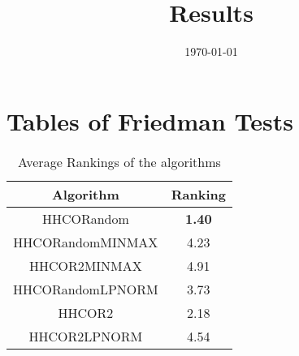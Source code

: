 \documentclass{article}
\title{Results}
\author{}
\date{\today}
\begin{document}
\oddsidemargin 0in \topmargin 0in\maketitle
\section{Tables of Friedman Tests}
\begin{table}[!htp]
\centering
\caption{Average Rankings of the algorithms
}\begin{tabular}{|c|c|}
\hline
Algorithm&Ranking\\
\hline
HHCORandom& {\bf 1.40}\\\hline
HHCORandomMINMAX&4.23\\\hline
HHCOR2MINMAX&4.91\\\hline
HHCORandomLPNORM&3.73\\\hline
HHCOR2&2.18\\\hline
HHCOR2LPNORM&4.54\\\hline
\end{tabular}
\end{table}
\end{document}
